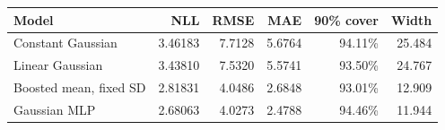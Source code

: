 \begin{center}\small
\begin{tabular}{lrrrrr}
\toprule
Model & NLL & RMSE & MAE & 90\% cover & Width \\
\midrule
Constant Gaussian & 3.46183 & 7.7128 & 5.6764 & 94.11\% & 25.484 \\
Linear Gaussian & 3.43810 & 7.5320 & 5.5741 & 93.50\% & 24.767 \\
Boosted mean, fixed SD & 2.81831 & 4.0486 & 2.6848 & 93.01\% & 12.909 \\
Gaussian MLP & 2.68063 & 4.0273 & 2.4788 & 94.46\% & 11.944 \\
\bottomrule
\end{tabular}\end{center}
